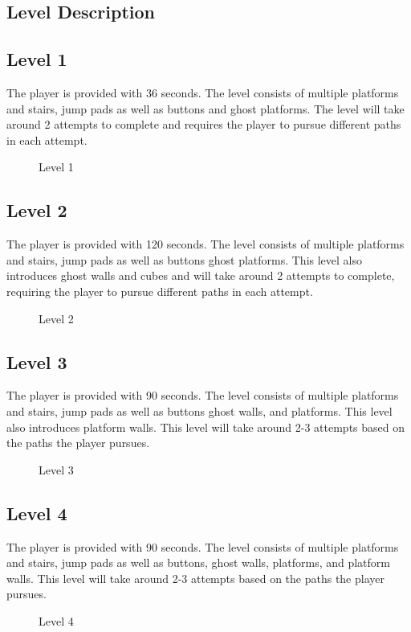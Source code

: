 \documentclass[10pt,twocolumn]{article}
\begin{document}
\begin{onecolumn}
  \section*{Level Description}
  \subsection*{Level 1}
  The player is provided with 36 seconds. The level consists of multiple platforms and stairs, jump pads as well as buttons and ghost platforms. The level will take around 2 attempts to complete and requires the player to pursue different paths in each attempt.

  \begin{figure*}[h]
    \centering
    
    \caption{Level 1}
  \end{figure*}

  \subsection*{Level 2}
  The player is provided with 120 seconds. The level consists of multiple platforms and stairs, jump pads as well as buttons ghost platforms. This level also introduces ghost walls and cubes and will take around 2 attempts to complete, requiring the player to pursue different paths in each attempt.

  \begin{figure*}[h]
    \centering
    
    \caption{Level 2}
  \end{figure*}

  \pagebreak

  \subsection*{Level 3}
  The player is provided with 90 seconds. The level consists of multiple platforms and stairs, jump pads as well as buttons ghost walls, and platforms. This level also introduces platform walls. This level will take around 2-3 attempts based on the paths the player pursues.

  \begin{figure*}[h]
    \centering
    
    \caption{Level 3}
  \end{figure*}

  \subsection*{Level 4}
  The player is provided with 90 seconds. The level consists of multiple platforms and stairs, jump pads as well as buttons, ghost walls, platforms, and platform walls. This level will take around 2-3 attempts based on the paths the player pursues.

  \begin{figure*}[h]
    \centering
    
    \caption{Level 4}
  \end{figure*}
\end{onecolumn}
\end{document}

